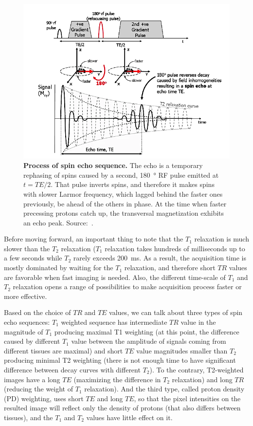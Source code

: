 \begin{figure}[thb]
    \centering
    \includegraphics[width=0.8\linewidth]{images/spin_echo.png}
    \caption{\textbf{Process of spin echo sequence.} The echo is a temporary rephasing of spins caused by a second, \SI{180}{\degree} RF pulse emitted at $t = TE/2$. That pulse inverts spins, and therefore it makes spins with slower Larmor frequency, which lagged behind the faster ones previously, be ahead of the others in phase. At the time when faster precessing protons catch up, the transversal magnetization exhibits an echo peak. Source:~\cite{ridgway_cardiovascular_2010}.}
    \label{fig:spin_echo}
\end{figure}

Before moving forward, an important thing to note that the $T_1$ relaxation is much slower than the $T_2$ relaxation ($T_1$ relaxation takes hundreds of milliseconds up to a few seconds while $T_2$ rarely exceeds \SI{200}{\milli\second}. As a result, the acquisition time is mostly dominated by waiting for the $T_1$ relaxation, and therefore short $TR$ values are favorable when fast imaging is needed. Also, the different time-scale of $T_1$ and $T_2$ relaxation opens a range of possibilities to make acquisition process faster or more effective.

Based on the choice of $TR$ and $TE$ values, we can talk about three types of spin echo sequences: $T_1$ weighted sequence has intermediate $TR$ value in the magnitude of $T_1$ producing maximal T1 weighting (at this point, the difference caused by different $T_1$ value between the amplitude of signals coming from different tissues are maximal) and short $TE$ value magnitudes smaller than $T_2$ producing minimal T2 weighting (there is not enough time to have significant difference between decay curves with different $T_2$). To the contrary, T2-weighted images have a long $TE$ (maximizing the difference in $T_2$ relaxation) and long $TR$ (reducing the weight of $T_1$ relaxation). And the third type, called proton density (PD) weighting, uses short $TE$ and long $TE$, so that the pixel intensities on the resulted image will reflect only the density of protons (that also differs between tissues), and the $T_1$ and $T_2$ values have little effect on it.

